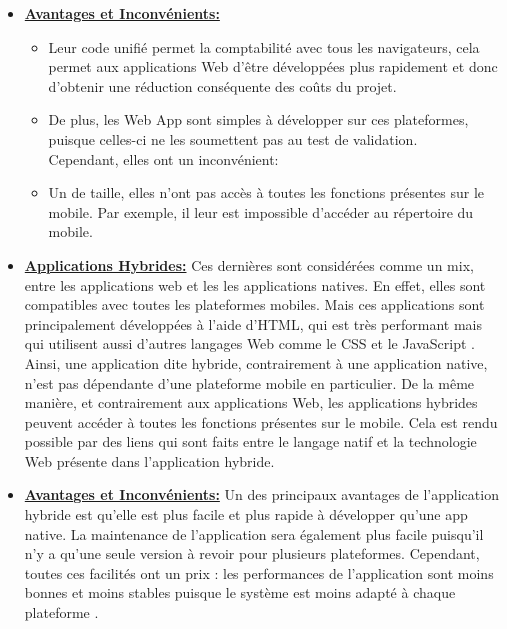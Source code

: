 \documentclass[french,a4,12pt]{report}
\begin{document}
\begin{itemize}
	\item{ \underline{ \textbf{Avantages et Inconvénients:}}}
	\begin{itemize}%
		\item Leur code unifié permet la comptabilité avec tous les navigateurs, cela permet aux applications Web d'être développées plus rapidement et donc d'obtenir une réduction conséquente des coûts du projet.
		\item  De plus, les Web App sont simples à développer sur ces plateformes, puisque celles-ci ne les soumettent pas au test de validation.\\
		Cependant, elles ont un inconvénient:
		\item  Un de taille, elles n'ont pas accès à toutes les fonctions présentes sur le mobile. Par exemple, il leur est impossible d'accéder au répertoire du mobile.
	\end{itemize}
	
	\item{ \underline{ \textbf{Applications Hybrides:}}}
	\textsf{Ces dernières sont considérées comme un mix, entre les applications web et les les applications natives.  En effet, elles sont compatibles avec toutes les plateformes mobiles. Mais ces applications sont principalement développées à l'aide d'HTML,  qui est très performant mais qui utilisent aussi d'autres langages Web comme le CSS et le JavaScript \cite{2}.\\
	Ainsi, une application dite hybride, contrairement à une application native, n'est pas dépendante d'une plateforme mobile en particulier. De la même manière, et contrairement aux applications Web, les applications hybrides peuvent accéder à toutes les fonctions présentes sur le mobile. Cela est rendu possible par des liens qui sont faits entre le langage natif et la technologie Web présente dans l'application hybride.}\\
	
	\item{ \underline{ \textbf{Avantages et Inconvénients:}}}
	Un des principaux avantages de l'application hybride est qu'elle est plus facile et plus rapide à développer qu'une app native. La maintenance de l'application sera également plus facile puisqu'il n'y a qu'une seule version à revoir pour plusieurs plateformes. Cependant, toutes ces facilités ont un prix : les performances de l'application sont moins bonnes et moins stables puisque le système est moins adapté à chaque plateforme \cite{3}.
\end{itemize}
\end{document}
